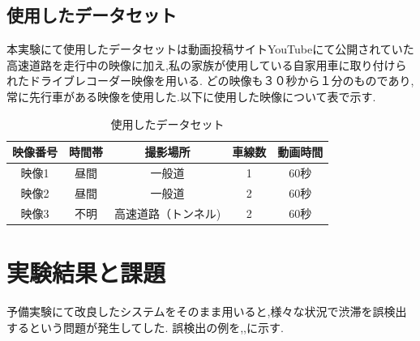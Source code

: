 \subsection{使用したデータセット}
本実験にて使用したデータセットは動画投稿サイトYouTubeにて公開されていた高速道路を走行中の映像に加え,私の家族が使用している自家用車に取り付けられたドライブレコーダー映像を用いる.
どの映像も３０秒から１分のものであり,常に先行車がある映像を使用した.以下に使用した映像について表で示す.

\begin{table}[htbp]
  \centering
  \begin{scriptsize}
  \begin{tabular}{ccccc}
  \toprule
映像番号 & 時間帯 & 撮影場所 & 車線数 & 動画時間\\
  \midrule
映像1 & 昼間 & 一般道 & 1 & 60秒\\
映像2 & 昼間 & 一般道 & 2 & 60秒\\
映像3 & 不明 & 高速道路（トンネル) & 2 & 60秒 \\
  \bottomrule
  \end{tabular}
  \end{scriptsize}
  \caption{使用したデータセット}
  \label{tab:dataset}
\end{table}

\section{実験結果と課題}
\label{sec:kadai}
予備実験にて改良したシステムをそのまま用いると,様々な状況で渋滞を誤検出するという問題が発生してした.
誤検出の例を,,に示す.

